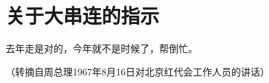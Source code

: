 \section[关于大串连的指示（一九六七年八月）]{关于大串连的指示}


去年走是对的，今年就不是时候了，帮倒忙。

{\raggedleft （转摘自周总理1967年8月16日对北京红代会工作人员的讲话）\par}



